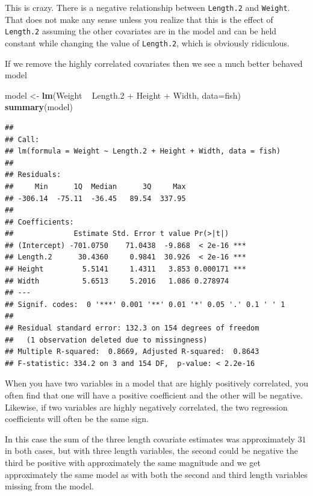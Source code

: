 \documentclass[]{book}
\newenvironment{Shaded}{\begin{snugshade}}{\end{snugshade}}
\newcommand{\KeywordTok}[1]{\textcolor[rgb]{0.13,0.29,0.53}{\textbf{{#1}}}}
\newcommand{\DataTypeTok}[1]{\textcolor[rgb]{0.13,0.29,0.53}{{#1}}}
\newcommand{\FloatTok}[1]{\textcolor[rgb]{0.00,0.00,0.81}{{#1}}}
\newcommand{\StringTok}[1]{\textcolor[rgb]{0.31,0.60,0.02}{{#1}}}
\newcommand{\NormalTok}[1]{{#1}}
\theoremstyle{definition}
\theoremstyle{definition}
\theoremstyle{remark}
\begin{document}
This is crazy. There is a negative relationship between
\texttt{Length.2} and \texttt{Weight}. That does not make any sense
unless you realize that this is the effect of \texttt{Length.2} assuming
the other covariates are in the model and can be held constant while
changing the value of \texttt{Length.2}, which is obviously ridiculous.

If we remove the highly correlated covariates then we see a much better
behaved model

\begin{Shaded}
\begin{Highlighting}[]
\NormalTok{model <-}\StringTok{ }\KeywordTok{lm}\NormalTok{(Weight ~}\StringTok{ }\NormalTok{Length}\FloatTok{.2} \NormalTok{+}\StringTok{ }\NormalTok{Height +}\StringTok{ }\NormalTok{Width, }\DataTypeTok{data=}\NormalTok{fish)}
\KeywordTok{summary}\NormalTok{(model)}
\end{Highlighting}
\end{Shaded}

\begin{verbatim}
## 
## Call:
## lm(formula = Weight ~ Length.2 + Height + Width, data = fish)
## 
## Residuals:
##     Min      1Q  Median      3Q     Max 
## -306.14  -75.11  -36.45   89.54  337.95 
## 
## Coefficients:
##              Estimate Std. Error t value Pr(>|t|)    
## (Intercept) -701.0750    71.0438  -9.868  < 2e-16 ***
## Length.2      30.4360     0.9841  30.926  < 2e-16 ***
## Height         5.5141     1.4311   3.853 0.000171 ***
## Width          5.6513     5.2016   1.086 0.278974    
## ---
## Signif. codes:  0 '***' 0.001 '**' 0.01 '*' 0.05 '.' 0.1 ' ' 1
## 
## Residual standard error: 132.3 on 154 degrees of freedom
##   (1 observation deleted due to missingness)
## Multiple R-squared:  0.8669, Adjusted R-squared:  0.8643 
## F-statistic: 334.2 on 3 and 154 DF,  p-value: < 2.2e-16
\end{verbatim}

When you have two variables in a model that are highly positively
correlated, you often find that one will have a positive coefficient and
the other will be negative. Likewise, if two variables are highly
negatively correlated, the two regression coefficients will often be the
same sign.

In this case the sum of the three length covariate estimates was
approximately \(31\) in both cases, but with three length variables, the
second could be negative the third be positive with approximately the
same magnitude and we get approximately the same model as with both the
second and third length variables missing from the model.
\end{document}
